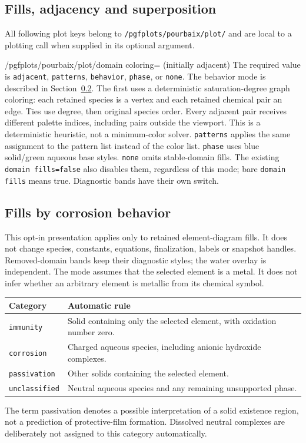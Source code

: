 \documentclass[a4paper,11pt]{ltxdoc}
\begin{document}
\subsection{Fills, adjacency and superposition}
All following plot keys belong to \texttt{/pgfplots/pourbaix/plot/} and are local
to a plotting call when supplied in its optional argument.
\begin{key}{/pgfplots/pourbaix/plot/domain coloring= (initially adjacent)}
The required value is \texttt{adjacent}, \texttt{patterns}, \texttt{behavior},
\texttt{phase}, or \texttt{none}. The behavior mode is described in
Section~\ref{sec:behavior-fills}.
The first uses a deterministic saturation-degree graph coloring: each retained
species is a vertex and each retained chemical pair an edge. Ties use degree,
then original species order. Every adjacent pair receives different palette
indices, including pairs outside the viewport. This is a deterministic heuristic,
not a minimum-color solver. \texttt{patterns} applies the same assignment to
the pattern list instead of the color list. \texttt{phase} uses blue solid/green
aqueous base styles. \texttt{none} omits stable-domain fills. The existing
\texttt{domain fills=false} also disables them, regardless of this mode; bare
\texttt{domain fills} means true. Diagnostic bands have their own switch.
\end{key}
\subsection{Fills by corrosion behavior}
\label{sec:behavior-fills}
This opt-in presentation applies only to retained element-diagram fills. It does
not change species, constants, equations, finalization, labels or snapshot handles.
Removed-domain bands keep their diagnostic styles; the water overlay is independent.
The mode assumes that the selected element is a metal. It does not infer whether
an arbitrary element is metallic from its chemical symbol.

\begin{center}
\begin{tabular}{lp{.65\linewidth}}
Category & Automatic rule\\\hline
\texttt{immunity} & Solid containing only the selected element, with oxidation number zero.\\
\texttt{corrosion} & Charged aqueous species, including anionic hydroxide complexes.\\
\texttt{passivation} & Other solids containing the selected element.\\
\texttt{unclassified} & Neutral aqueous species and any remaining unsupported phase.\\
\end{tabular}
\end{center}
The term passivation denotes a possible interpretation of a solid existence
region, not a prediction of protective-film formation. Dissolved neutral
complexes are deliberately not assigned to this category automatically.
\end{document}
